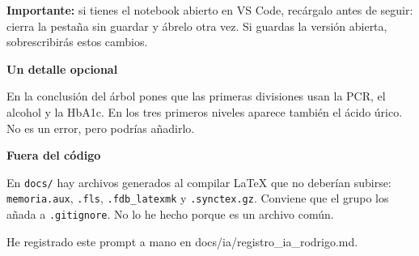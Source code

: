 \documentclass[11pt,a4paper]{article}
\begin{document}
{\textbf{Importante:} si tienes el notebook abierto en VS Code, recárgalo antes de seguir: cierra la pestaña sin guardar y ábrelo otra vez. Si guardas la versión abierta, sobrescribirás estos cambios.

\smallskip\noindent\textbf{Un detalle opcional}\par
En la conclusión del árbol pones que las primeras divisiones usan la PCR, el alcohol y la HbA1c. En los tres primeros niveles aparece también el ácido úrico. No es un error, pero podrías añadirlo.

\smallskip\noindent\textbf{Fuera del código}\par
En \texttt{docs/\allowbreak{}} hay archivos generados al compilar LaTeX que no deberían subirse: \texttt{memoria.aux}, \texttt{.fls}, \texttt{.fdb\_\allowbreak{}latexmk} y \texttt{.synctex.gz}. Conviene que el grupo los añada a \texttt{.gitignore}. No lo he hecho porque es un archivo común.

He registrado este prompt a mano en docs/\allowbreak{}ia/\allowbreak{}registro\_\allowbreak{}ia\_\allowbreak{}rodrigo.md.

}
\end{document}
